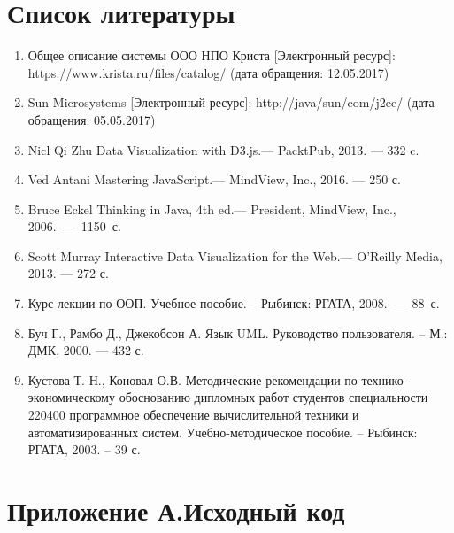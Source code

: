 \documentclass[a4paper]{extarticle}
\numberwithin{equation}{section}
\begin{document}
\newpage
\section*{Список литературы}
\begin{enumerate}
\item Общее описание системы ООО НПО Криста [Электронный ресурс]: https://www.krista.ru/files/catalog/ (дата обращения: 12.05.2017)
\item Sun Microsystems [Электронный ресурс]: http://java/sun/com/j2ee/ (дата обращения: 05.05.2017)
\item Nicl Qi Zhu Data Visualization with D3.js.— PacktPub, 2013. — 332 c.
\item Ved Antani Mastering JavaScript.— MindView, Inc., 2016. — 250 с.
\item Bruce Eckel Thinking in Java, 4th ed.— President, MindView, Inc., 2006.~—~1150~с.
\item Scott Murray Interactive Data Visualization for the Web.— O'Reilly Media, 2013. — 272 с.
\item Курс лекции по ООП. Учебное пособие. – Рыбинск: РГАТА, 2008.~—~88~с.
\item Буч Г., Рамбо Д., Джекобсон А. Язык UML. Руководство пользователя. – М.: ДМК, 2000. — 432 с.
\item Кустова Т. Н., Коновал О.В. Методические рекомендации по технико- экономическому обоснованию дипломных работ студентов специальности 220400 программное обеспечение вычислительной техники и автоматизированных систем. Учебно-методическое пособие. – Рыбинск: РГАТА, 2003. – 39 с.
\end{enumerate}

\newpage
\section*{Приложение А.Исходный код}


\end{document}
